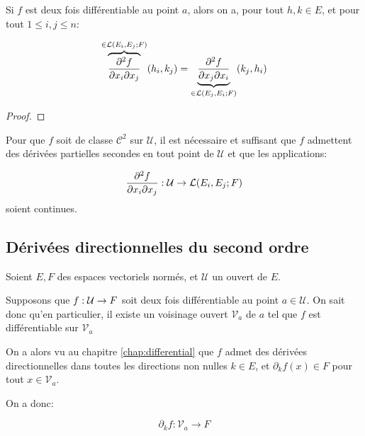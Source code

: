 \begin{theorem}
	Si $f$ est deux fois différentiable au point $a$, alors on a, pour tout $h,
	k \in E$, et pour tout $1 \leq i, j \leq n$:

	\begin{equation}
		\overbrace{\pdv{f}{x_{i}}{x_{j}} (a)}^{\in \mathcal{L}(E_{i},
		E_{j}; F)} (h_{i}, k_{j}) = \underbrace{\pdv{f}{x_{j}}{x_{i}} (a)}_{\in
			\mathcal{L}(E_{j}, E_{i}; F)}
		(k_{j}, h_{i})
	\end{equation}
\end{theorem}

\ifdefined\outputproof
\begin{proof}

\end{proof}
\fi


\begin{proposition}
	Pour que $f$ soit de classe $\mathcal{C}^{2}$ sur $\mathcal{U}$, il est nécessaire et
	suffisant que $f$ admettent des dérivées partielles secondes en tout point
	de $\mathcal{U}$ et que les applications:

	\begin{equation}
		\pdv{f}{x_{i}}{x_{j}} (a) : \mathcal{U} \rightarrow
		\mathcal{L}(E_{i}, E_{j}; F)
	\end{equation}
	soient continues.
\end{proposition}

\subsection{Dérivées directionnelles du second ordre}

Soient $E, F$ des espaces vectoriels normés, et $\mathcal{U}$ un ouvert de $E$.

Supposons que $f : \mathcal{U} \rightarrow F$ soit deux fois différentiable au
point $a \in \mathcal{U}$.
On sait donc qu'en particulier, il existe un voisinage ouvert $\mathcal{V}_{a}$ de $a$ tel
que $f$ est différentiable sur $\mathcal{V}_{a}$

On a alors vu au chapitre \ref{chap:differential} que $f$ admet des
dérivées directionnelles dans toutes les directions non nulles $k \in E$, et
$\partial_{k}{f} (x) \in F$ pour tout $x \in \mathcal{V}_{a}$.

On a donc:

\begin{equation}
	\partial_{k}f : \mathcal{V}_{a} \rightarrow F
\end{equation}

